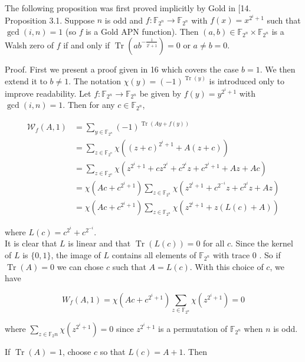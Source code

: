 \documentclass[10pt]{article}
\begin{document}
The following proposition was first proved implicitly by Gold in [14.\\
Proposition 3.1. Suppose $n$ is odd and $f: \mathbb{F}_{2^{n}} \rightarrow \mathbb{F}_{2^{n}}$ with $f(x)=x^{2^{i}+1}$ such that $\operatorname{gcd}(i, n)=1$ (so $f$ is a Gold APN function). Then $(a, b) \in \mathbb{F}_{2^{n}} \times \mathbb{F}_{2^{n}}$ is a Walsh zero of $f$ if and only if $\operatorname{Tr}\left(a b^{-\frac{1}{2^{i}+1}}\right)=0$ or $a \neq b=0$.

Proof. First we present a proof given in 16 which covers the case $b=1$. We then extend it to $b \neq 1$. The notation $\chi(y)=(-1)^{\operatorname{Tr}(y)}$ is introduced only to improve readability. Let $f: \mathbb{F}_{2^{n}} \rightarrow \mathbb{F}_{2^{n}}$ be given by $f(y)=y^{2^{i}+1}$ with $\operatorname{gcd}(i, n)=1$. Then for any $c \in \mathbb{F}_{2^{n}}$,

$$
\begin{aligned}
\mathcal{W}_{f}(A, 1) & =\sum_{y \in \mathbb{F}_{2^{n}}}(-1)^{\operatorname{Tr}(A y+f(y))} \\
& =\sum_{z \in \mathbb{F}_{2^{n}}} \chi\left((z+c)^{2^{i}+1}+A(z+c)\right) \\
& =\sum_{z \in \mathbb{F}_{2^{n}}} \chi\left(z^{2^{i}+1}+c z^{2^{i}}+c^{2^{i}} z+c^{2^{i}+1}+A z+A c\right) \\
& =\chi\left(A c+c^{2^{i}+1}\right) \sum_{z \in \mathbb{F}_{2^{n}}} \chi\left(z^{2^{i}+1}+c^{2^{-i}} z+c^{2^{i}} z+A z\right) \\
& =\chi\left(A c+c^{2^{i}+1}\right) \sum_{z \in \mathbb{F}_{2^{n}}} \chi\left(z^{2^{i}+1}+z(L(c)+A)\right)
\end{aligned}
$$

where $L(c)=c^{2^{i}}+c^{2^{-i}}$.\\
It is clear that $L$ is linear and that $\operatorname{Tr}(L(c))=0$ for all $c$. Since the kernel of $L$ is $\{0,1\}$, the image of $L$ contains all elements of $\mathbb{F}_{2^{n}}$ with trace 0 . So if $\operatorname{Tr}(A)=0$ we can chose $c$ such that $A=L(c)$. With this choice of $c$, we have

$$
W_{f}(A, 1)=\chi\left(A c+c^{2^{i}+1}\right) \sum_{z \in \mathbb{F}_{2^{n}}} \chi\left(z^{2^{i}+1}\right)=0
$$

where $\sum_{z \in \mathbb{F}_{2} n} \chi\left(z^{2^{i}+1}\right)=0$ since $z^{2^{i}+1}$ is a permutation of $\mathbb{F}_{2^{n}}$ when $n$ is odd.

If $\operatorname{Tr}(A)=1$, choose $c$ so that $L(c)=A+1$. Then
\end{document}
